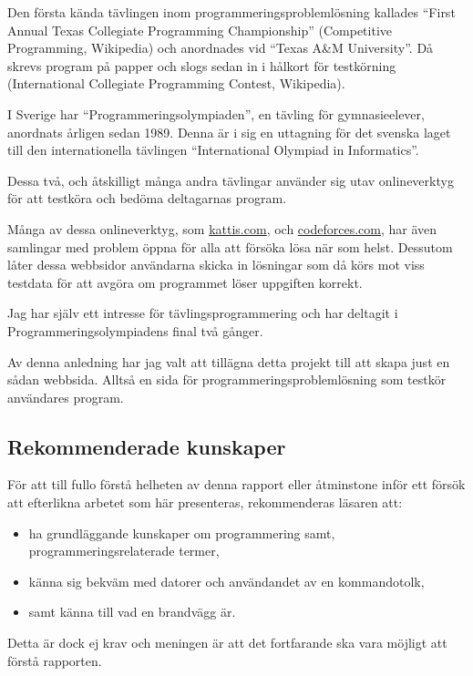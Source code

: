 \documentclass{article}
\begin{document}
Den första kända tävlingen inom programmeringsproblemlösning kallades ``First
Annual Texas Collegiate Programming Championship'' (Competitive Programming,
Wikipedia) och anordnades vid ``Texas A\&M University''. Då skrevs program på
papper och slogs sedan in i hålkort för testkörning (International Collegiate
Programming Contest, Wikipedia).

I Sverige har ``Programmeringsolympiaden'', en tävling för gymnasieelever,
anordnats årligen sedan 1989. Denna är i sig en uttagning för det svenska laget
till den internationella tävlingen ``International Olympiad in Informatics''.

Dessa två, och åtskilligt många andra tävlingar använder sig utav onlineverktyg
för att testköra och bedöma deltagarnas program.

Många av dessa onlineverktyg, som \href{https://open.kattis.com}{kattis.com},
och \href{https://codefoces.com}{codeforces.com}, har även samlingar med problem
öppna för alla att försöka lösa när som helst. Dessutom låter dessa webbsidor
användarna skicka in lösningar som då körs mot viss testdata för att avgöra om
programmet löser uppgiften korrekt.

Jag har själv ett intresse för tävlingsprogrammering och har deltagit i
Programmeringsolympiadens final två gånger.

Av denna anledning har jag valt att tillägna detta projekt till att skapa just
en sådan webbsida. Alltså en sida för programmeringsproblemlösning som testkör
användares program.

\subsection{Rekommenderade kunskaper}

För att till fullo förstå helheten av denna rapport eller åtminstone inför ett
försök att efterlikna arbetet som här presenteras, rekommenderas läsaren att:

\begin{itemize}
	\item ha grundläggande kunskaper om programmering samt,
		programmeringsrelaterade termer,
	\item känna sig bekväm med datorer och användandet av en kommandotolk,
	\item samt känna till vad en brandvägg är.
\end{itemize}

Detta är dock ej krav och meningen är att det fortfarande ska vara möjligt att
förstå rapporten.
\end{document}
